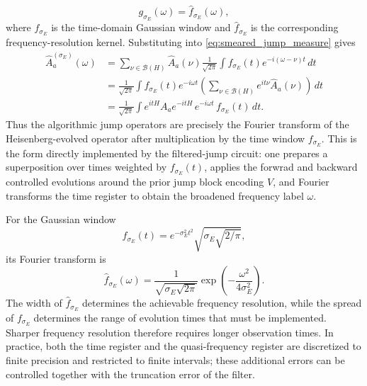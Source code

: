 \documentclass[showpacs,amsmath,amssymb,twocolumn,prx,superscriptaddress,10pt,aps,nofootinbib]{revtex4-2}
\begin{document}
\begin{equation}
g_{\sigma_E}(\omega)=\hat f_{\sigma_E}(\omega),
\end{equation}
where $f_{\sigma_E}$ is the time-domain Gaussian window and $\hat f_{\sigma _E}$ is the corresponding frequency-resolution kernel. Substituting into \eqref{eq:smeared_jump_measure} gives
\begin{align}
\hat A_a^{(\sigma_E)}(\omega)
&=
\sum_{\nu\in\mathcal B(H)}
\hat A_a(\nu)
\frac{1}{\sqrt{2\pi}}
\int
f_{\sigma_E}(t)e^{-i(\omega-\nu)t}\,dt \nonumber \\
&=
\frac{1}{\sqrt{2\pi}}
\int
f_{\sigma_E}(t)e^{-i\omega t}
\left(\sum_{\nu\in\mathcal B(H)} e^{it\nu}\hat A_a(\nu)\right)\,dt \nonumber \\
&=
\frac{1}{\sqrt{2\pi}}
\int
e^{itH}A_ae^{-itH}\,e^{-i\omega t}\,f_{\sigma_E}(t)\,dt.
\end{align}
Thus the algorithmic jump operators are precisely the Fourier transform of the Heisenberg-evolved operator after multiplication by the time window $f_{\sigma_E}$. This is the form directly implemented by the filtered-jump circuit: one prepares a superposition over times weighted by $f_{\sigma_E}(t)$, applies the forwrad and backward controlled evolutions around the prior jump block encoding $V$, and Fourier transforms the time register to obtain the broadened frequency label $\omega$.

For the Gaussian window
\begin{equation}
f_{\sigma _E}(t)=e^{-\sigma_E^2 t^2}\sqrt{\sigma_E\sqrt{2/\pi}},
\end{equation}
its Fourier transform is
\begin{equation}
\hat f_{\sigma_E}(\omega)
=
\frac{1}{\sqrt{\sigma_E\sqrt{2\pi}}}
\exp\!\left(-\frac{\omega^2}{4\sigma_E^2}\right).
\end{equation}
The width of  $\hat f _{\sigma_E}$ determines the achievable frequency resolution, while the spread of $f_{\sigma_E}$ determines the range of evolution times that must be implemented. Sharper frequency resolution therefore requires longer observation times. In practice, both the time register and the quasi-frequency register are discretized to finite precision and restricted to finite intervals; these additional errors can be controlled together with the truncation error of the filter.
\end{document}
